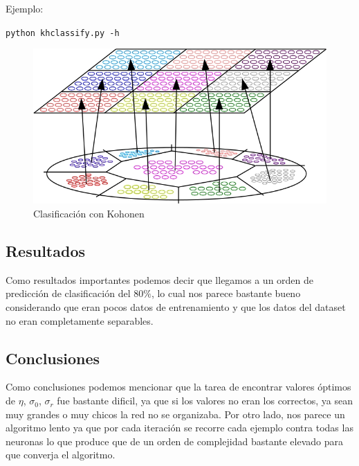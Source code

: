 Ejemplo:

\noindent\texttt{python khclassify.py -h} \\

\begin{figure}[ht!]
	\centering
	\includegraphics[width=0.8\linewidth]{img/parte2-kohonen9clases.jpg}
	\caption{Clasificación con Kohonen}
	\label{Kohonen}
\end{figure}


\subsection{Resultados}
Como resultados importantes podemos decir que llegamos a un orden de predicción de clasificación del 80$\%$, lo cual nos parece bastante bueno considerando que eran pocos datos de entrenamiento y que los datos del dataset no eran completamente separables.

\subsection{Conclusiones}
Como conclusiones podemos mencionar que la tarea de encontrar valores óptimos de $\eta$, $\sigma_{0}$, $\sigma_{r}$ fue bastante dificil, ya que si los valores no eran los correctos, ya sean muy grandes o muy chicos la red no se organizaba.
Por otro lado, nos parece un algoritmo lento ya que por cada iteración se recorre cada ejemplo contra todas las neuronas lo que produce que de un orden de complejidad bastante elevado para que converja el algoritmo.